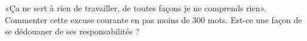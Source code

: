
\begin{exercice}\label{exosmath-0454}

    «Ça ne sert à rien de travailler, de toutes façons je ne comprends rien». Commenter cette excuse courante en pas moins de 300 mots. Est-ce une façon de se dédouaner de ses responsabilités ?

\end{exercice}
